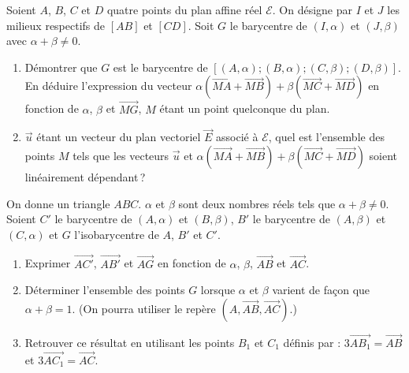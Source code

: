 \begin{exo}\label{exo:bary-4}
      Soient $A$, $B$, $C$ et $D$ quatre points du plan affine r\'eel $\mathcal{E}$.
      On d\'esigne par $I$ et $J$ les milieux respectifs de $[AB]$ et $[CD]$.
      Soit $G$ le barycentre de $(I,\alpha)$ et $(J,\beta)$ avec $\alpha + \beta \neq 0$.
      \begin{enumerate}
            \item D\'emontrer que $G$ est le barycentre de $[(A,\alpha) ; (B,\alpha) ; (C,\beta) ; (D,\beta)]$.
                  En d\'eduire l'expression du vecteur 
                  $\alpha \left( \overrightarrow{MA} + \overrightarrow{MB} \right) + \beta \left( \overrightarrow{MC} + \overrightarrow{MD} \right)$
                  en fonction de $\alpha$, $\beta$ et $\overrightarrow{MG}$, $M$ \'etant un point quelconque du plan.
            \item $\vec{u}$ \'etant un vecteur du plan vectoriel $\overrightarrow{E}$ associ\'e \`a $\mathcal{E}$,
                  quel est l'ensemble des points $M$ tels que les vecteurs $\overrightarrow{u}$ et
                  $\alpha \left( \overrightarrow{MA} + \overrightarrow{MB} \right) + \beta \left( \overrightarrow{MC} + \overrightarrow{MD} \right)$
                  soient lin\'eairement d\'ependant\,?
      \end{enumerate}
\end{exo}
%
\begin{exo}\label{exo:bary-5}
      On donne un triangle $ABC$.
      $\alpha$ et $\beta$ sont deux nombres r\'eels tels que $\alpha + \beta \neq 0$.
      Soient $C'$ le barycentre de $(A,\alpha)$ et $(B,\beta)$,
      $B'$ le barycentre de $(A,\beta)$ et $(C,\alpha)$ et 
      $G$ l'isobarycentre de $A$, $B'$ et $C'$.
      \begin{enumerate}
            \item Exprimer $\overrightarrow{AC'}$, $\overrightarrow{AB'}$ et $\overrightarrow{AG}$ en fonction de $\alpha$, $\beta$, $\overrightarrow{AB}$ et $\overrightarrow{AC}$.
            \item D\'eterminer l'ensemble des points $G$ lorsque $\alpha$ et $\beta$ 
                  varient de fa\c{c}on que $\alpha + \beta = 1$. (On pourra utiliser le rep\`ere $(A,\overrightarrow{AB},\overrightarrow{AC})$.)
            \item Retrouver ce r\'esultat en utilisant les points $B_1$ et $C_1$ d\'efinis par : 
                  $3\overrightarrow{AB_1} = \overrightarrow{AB}$ et $3\overrightarrow{AC_1} = \overrightarrow{AC}$.
      \end{enumerate}
\end{exo}
